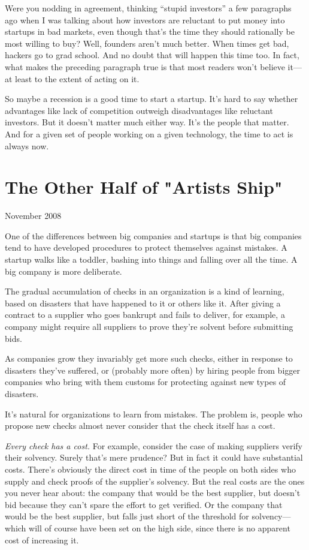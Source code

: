 \documentclass[12pt]{book}
\begin{document}
Were you nodding in agreement, thinking ``stupid investors'' a few
paragraphs ago when I was talking about how investors are reluctant to
put money into startups in bad markets, even though that's the time they
should rationally be most willing to buy? Well, founders aren't much
better. When times get bad, hackers go to grad school. And no doubt that
will happen this time too. In fact, what makes the preceding paragraph
true is that most readers won't believe it---at least to the extent of
acting on it.

So maybe a recession is a good time to start a startup. It's hard to say
whether advantages like lack of competition outweigh disadvantages like
reluctant investors. But it doesn't matter much either way. It's the
people that matter. And for a given set of people working on a given
technology, the time to act is always now.
\chapter{The Other Half of "Artists Ship"  }

November 2008

One of the differences between big companies and startups is that big
companies tend to have developed procedures to protect themselves
against mistakes. A startup walks like a toddler, bashing into things
and falling over all the time. A big company is more deliberate.

The gradual accumulation of checks in an organization is a kind of
learning, based on disasters that have happened to it or others like it.
After giving a contract to a supplier who goes bankrupt and fails to
deliver, for example, a company might require all suppliers to prove
they're solvent before submitting bids.

As companies grow they invariably get more such checks, either in
response to disasters they've suffered, or (probably more often) by
hiring people from bigger companies who bring with them customs for
protecting against new types of disasters.

It's natural for organizations to learn from mistakes. The problem is,
people who propose new checks almost never consider that the check
itself has a cost.

\emph{Every check has a cost.} For example, consider the case of making
suppliers verify their solvency. Surely that's mere prudence? But in
fact it could have substantial costs. There's obviously the direct cost
in time of the people on both sides who supply and check proofs of the
supplier's solvency. But the real costs are the ones you never hear
about: the company that would be the best supplier, but doesn't bid
because they can't spare the effort to get verified. Or the company that
would be the best supplier, but falls just short of the threshold for
solvency---which will of course have been set on the high side, since
there is no apparent cost of increasing it.
\end{document}
